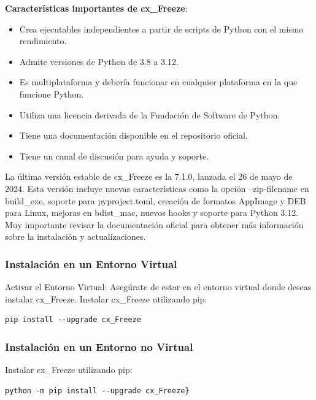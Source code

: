 {\bf{Características importantes de cx\_Freeze}}:

\begin{itemize}
	\item[$-$]  Crea ejecutables independientes a partir de scripts de Python con el mismo rendimiento. 
    \item[$-$] 	Admite versiones de Python de 3.8 a 3.12.
	\item[$-$]  Es multiplataforma y debería funcionar en cualquier plataforma en la que funcione Python.
	\item[$-$]  Utiliza una licencia derivada de  la Fundación de Software de Python.
	\item[$-$]  Tiene una documentación disponible en el repositorio oficial.
	\item[$-$]  Tiene un canal de discusión para ayuda y soporte.
\end{itemize}

La última versión estable de {\ttfamily cx\_Freeze} es la 7.1.0, lanzada el 26 de mayo de 2024. 
Esta versión incluye nuevas características como la opción {\ttfamily --zip-filename}  en {\ttfamily build\_exe}, 
soporte para {\ttfamily pyproject.toml}, creación de formatos {\ttfamily AppImage} y {\ttfamily DEB} para Linux, mejoras en {\ttfamily bdist\_mac}, nuevos {\ttfamily hooks} y soporte para Python 3.12. Muy importante  revisar la documentación oficial para obtener más información sobre la instalación y actualizaciones.



\subsubsection*{Instalación en un Entorno Virtual}

Activar el Entorno Virtual: Asegúrate de estar en el entorno virtual donde deseas instalar {\ttfamily cx\_Freeze}.
Instalar {\ttfamily cx\_Freeze} utilizando pip:
\begin{lstlisting}
pip install --upgrade cx_Freeze
\end{lstlisting}	


\subsubsection*{Instalación en un Entorno no Virtual}

Instalar {\ttfamily cx\_Freeze} utilizando {\ttfamily pip}:
\begin{lstlisting}
python -m pip install --upgrade cx_Freeze}
\end{lstlisting}	

